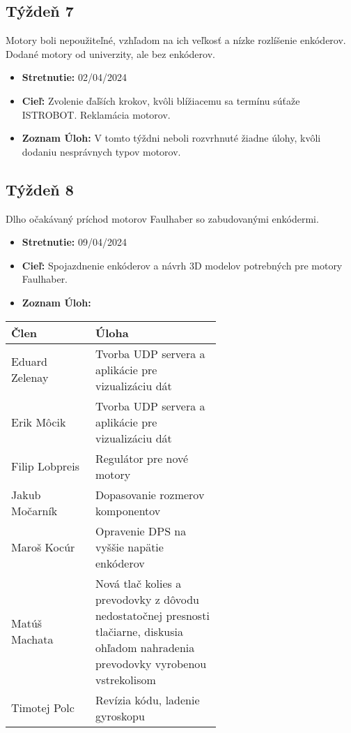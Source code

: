 \subsection{Týždeň 7}
Motory boli nepoužiteľné, vzhľadom na ich veľkosť a nízke rozlíšenie enkóderov. Dodané motory od univerzity, ale bez enkóderov.
\begin{itemize}
    \item \textbf{Stretnutie:} 02/04/2024
    \item \textbf{Cieľ: } Zvolenie ďaľších krokov, kvôli blížiacemu sa termínu súťaže ISTROBOT. Reklamácia motorov.
    \item \textbf{Zoznam Úloh:} V tomto týždni neboli rozvrhnuté žiadne úlohy, kvôli dodaniu nesprávnych typov motorov.
\end{itemize}

\subsection{Týždeň 8}
Dlho očakávaný príchod motorov Faulhaber so zabudovanými enkódermi.
\begin{itemize}
    \item \textbf{Stretnutie:} 09/04/2024
    \item \textbf{Cieľ: } Spojazdnenie enkóderov a návrh 3D modelov potrebných pre motory Faulhaber.
    \item \textbf{Zoznam Úloh:}
\end{itemize}

\begin{table}[H]
    \centering
    \begin{tabular}{|l|p{0.6\linewidth}|}
        \hline
        \textbf{Člen} & \textbf{Úloha} \\
        \hline
        Eduard Zelenay &  Tvorba UDP servera a aplikácie pre vizualizáciu dát\\
        \hline
        Erik Môcik & Tvorba UDP servera a aplikácie pre vizualizáciu dát \\
        \hline
        Filip Lobpreis & Regulátor pre nové motory \\
        \hline
        Jakub Močarník & Dopasovanie rozmerov komponentov \\
        \hline
        Maroš Kocúr & Opravenie DPS na vyššie napätie enkóderov \\
        \hline
        Matúš Machata & Nová tlač kolies a prevodovky z dôvodu nedostatočnej presnosti tlačiarne, diskusia ohľadom nahradenia prevodovky vyrobenou vstrekolisom \\
        \hline
        Timotej Polc & Revízia kódu, ladenie gyroskopu \\
        \hline
    \end{tabular}
\end{table}
\newpage
